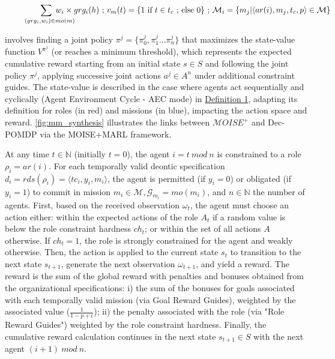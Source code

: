 \documentclass[pdflatex,sn-mathphys-num]{sn-jnl}%
\theoremstyle{thmstyleone}%
\theoremstyle{thmstyletwo}%
\theoremstyle{thmstylethree}%
\begin{document}
\begin{figure}[t]
\begin{scriptsize}
        \textcolor{blue}{
            \begin{gather*}
                \hspace{-0.5cm} \sum_{\hspace{0.3cm}(grg_i,w_i) \in mo(m)}{\hspace{-0.9cm} w_i \times grg_i(h)}
                \text{ ; } v_m(t) = \{ 1 \text{ if } t \in t_c \text{ ; else } 0 \} \text{ ; } \mathcal{M}_i = \{m_j | \langle ar(i),m_j,t_c,p \rangle \in \mathcal{M}\}
            \end{gather*}
        }
        \vspace{-0.6cm}
    \end{scriptsize}
    
\end{figure}



involves finding a joint policy $\pi^{j} = \{\pi^j_0,\pi^j_1\dots\pi^j_n\}$ that maximizes the state-value function $V^{\pi^{j}}$ (or reaches a minimum threshold), which represents the expected cumulative reward starting from an initial state $s \in S$ and following the joint policy $\pi^{j}$, applying successive joint actions $a^{j} \in A^n$ under additional constraint guides. The state-value is described in the case where agents act sequentially and cyclically (Agent Environment Cycle - AEC mode) in \hyperref[eq:single_value_function]{Definition 1}, adapting its definition for roles (in red) and missions (in blue), impacting the action space and reward. \autoref{fig:mm_synthesis} illustrates the links between $\mathcal{M}OISE^+$ and Dec-POMDP via the MOISE+MARL framework.

At any time $t \in \mathbb{N}$ (initially $t = 0$), the agent $i = t \ mod \ n$ is constrained to a role $\rho_i = ar(i)$. For each temporally valid deontic specification $d_i = rds(\rho_i) = \langle tc_i,y_i, m_i \rangle$, the agent is permitted (if $y_i = 0$) or obligated (if $y_i = 1$) to commit in mission $m_i \in \mathcal{M}, \mathcal{G}_{m_i} = mo(m_i)$, and $n \in \mathbb{N}$ the number of agents.
%
First, based on the received observation $\omega_t$, the agent must choose an action either: within the expected actions of the role $A_t$ if a random value is below the role constraint hardness $ch_t$; or within the set of all actions $A$ otherwise. If $ch_t = 1$, the role is strongly constrained for the agent and weakly otherwise.
%
Then, the action is applied to the current state $s_t$ to transition to the next state $s_{t+1}$, generate the next observation $\omega_{t+1}$, and yield a reward. The reward is the sum of the global reward with penalties and bonuses obtained from the organizational specifications: \quad i) the sum of the bonuses for goals associated with each temporally valid mission (via Goal Reward Guides), weighted by the associated value ($\frac{1}{1-p+\epsilon}$); \quad ii) the penalty associated with the role (via "Role Reward Guides") weighted by the role constraint hardness.
%
Finally, the cumulative reward calculation continues in the next state $s_{t+1} \in S$ with the next agent $(i+1) \ mod \ n$.
\end{document}
